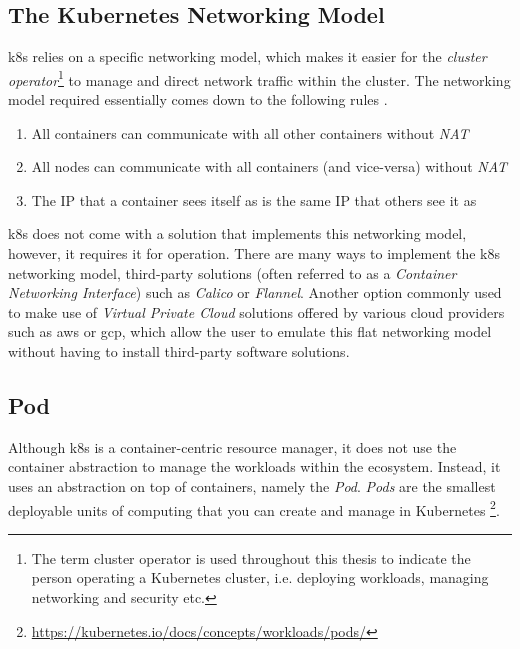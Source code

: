 \subsection{The Kubernetes Networking Model}
\label{sec:background:kubernetes:networking-model}

\Gls{k8s} relies on a specific networking model, which makes it easier for the \textit{cluster operator}\footnote{The term cluster operator is used throughout this thesis to indicate the person operating a Kubernetes cluster, i.e. deploying workloads, managing networking and security etc.} to manage and direct network traffic within the cluster. The networking model required essentially comes down to the following rules \cite{container-networking-from-scratch}.

\begin{enumerate}
  \item All containers can communicate with all other containers without \textit{NAT}
  \item All nodes can communicate with all containers (and vice-versa) without \textit{NAT}
  \item The IP that a container sees itself as is the same IP that others see it as
\end{enumerate}

\Gls{k8s} does not come with a solution that implements this networking model, however, it requires it for operation. There are many ways to implement the \gls{k8s} networking model, third-party solutions (often referred to as a \textit{Container Networking Interface}) such as \textit{Calico} or \textit{Flannel}. Another option commonly used to make use of \textit{Virtual Private Cloud} solutions offered by various cloud providers such as \gls{aws} or \gls{gcp}, which allow the user to emulate this flat networking model without having to install third-party software solutions.

\subsection{Pod}
\label{sec:background:kubernetes:pod}

Although \gls{k8s} is a container-centric resource manager, it does not use the container abstraction to manage the workloads within the ecosystem. Instead, it uses an abstraction on top of containers, namely the \textit{Pod}. \textit{Pods} are the smallest deployable units of computing that you can create and manage in Kubernetes \footnote{\url{https://kubernetes.io/docs/concepts/workloads/pods/}}. 

